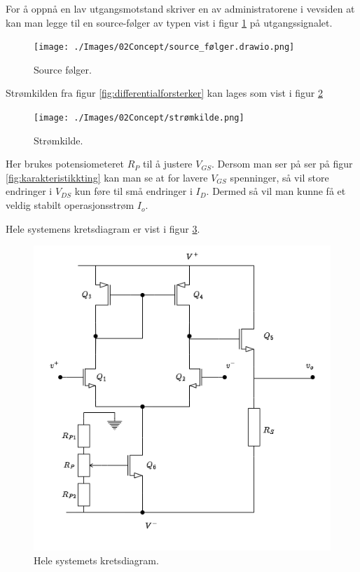 For å oppnå en lav utgangsmotstand skriver en  av administratorene i vevsiden \cite{admin_2021_mosfet} at kan man legge til en source-følger av typen vist i figur \ref{fig:source} på utgangssignalet. 

\begin{figure}[H]
	\centering
	\texttt{[image: ./Images/02Concept/source\_følger.drawio.png]}
	\caption{Source følger.\cite{pham_2022_selvlaget}}
	\label{fig:source}
\end{figure}

Strømkilden fra figur \ref{fig:differentialforsterker} kan lages som vist i figur \ref{fig:strømkilde}

\begin{figure}[H]
	\centering
	\texttt{[image: ./Images/02Concept/strømkilde.png]}
	\caption{Strømkilde.\cite{pham_2022_selvlaget}}
	\label{fig:strømkilde}
\end{figure}

Her brukes potensiometeret $R_P$ til å justere $V_{GS}$. Dersom man ser på ser på figur \ref{fig:karakteristikkting} kan man se at for lavere $V_{GS}$ spenninger, så vil store endringer i $V_{DS}$ kun føre til små endringer i $I_D$. Dermed så vil man kunne få et veldig stabilt operasjonsstrøm $I_o$.

Hele systemens kretsdiagram er vist i figur \ref{fig:kretsdiagram}.

\begin{figure}[H]
	\centering
	\includegraphics[scale=0.7]{./Images/02Concept/full_kretes.drawio.png}
	\caption{Hele systemets kretsdiagram.\cite{pham_2022_selvlaget}}
	\label{fig:kretsdiagram}
\end{figure}

